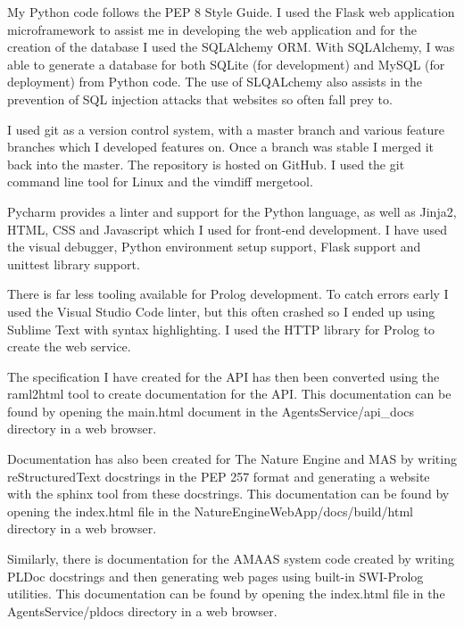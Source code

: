 \documentclass[]{final_report}
\begin{document}
My Python code follows the PEP 8 Style Guide. I used the Flask web application microframework to assist me in developing the web application and for the creation of the database I used the SQLAlchemy ORM. With SQLAlchemy, I was able to generate a database for both SQLite (for development) and MySQL (for deployment) from Python code. The use of SLQALchemy also assists in the prevention of SQL injection attacks that websites so often fall prey to.\par 
I used git as a version control system, with a master branch and various feature branches which I developed features on. Once a branch was stable I merged it back into the master. The repository is hosted on GitHub. I used the git command line tool for Linux and the vimdiff mergetool.\par 
Pycharm provides a linter and support for the Python language, as well as Jinja2, HTML, CSS and Javascript which I used for front-end development. I have used the visual debugger, Python environment setup support, Flask support and unittest library support.\par 
There is far less tooling available for Prolog development. To catch errors early I used the Visual Studio Code linter, but this often crashed so I ended up using Sublime Text with syntax highlighting. I used the HTTP library for Prolog to create the web service.\par 
The specification I have created for the API has then been converted using the raml2html tool to create documentation for the API. This documentation can be found by opening the main.html document in the AgentsService/api\_docs directory in a web browser.\par 
Documentation has also been created for The Nature Engine and MAS by writing reStructuredText docstrings in the PEP 257 format and generating a website with the sphinx tool from these docstrings. This documentation can be found by opening the index.html file in the NatureEngineWebApp/docs/build/html directory in a web browser.\par 
Similarly, there is documentation for the AMAAS system code created by writing PLDoc docstrings and then generating web pages using built-in SWI-Prolog utilities. This documentation can be found by opening the index.html file in the AgentsService/pldocs directory in a web browser.
\end{document}
